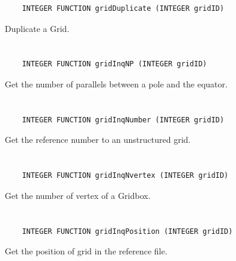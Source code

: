 \begin{verbatim}
    INTEGER FUNCTION gridDuplicate (INTEGER gridID)
\end{verbatim}

Duplicate a Grid.


\section*{\tt {}}

\begin{verbatim}
    INTEGER FUNCTION gridInqNP (INTEGER gridID)
\end{verbatim}

Get the number of parallels between a pole and the equator.


\section*{\tt {}}

\begin{verbatim}
    INTEGER FUNCTION gridInqNumber (INTEGER gridID)
\end{verbatim}

Get the reference number to an unstructured grid.


\section*{\tt {}}

\begin{verbatim}
    INTEGER FUNCTION gridInqNvertex (INTEGER gridID)
\end{verbatim}

Get the number of vertex of a Gridbox.


\section*{\tt {}}

\begin{verbatim}
    INTEGER FUNCTION gridInqPosition (INTEGER gridID)
\end{verbatim}

Get the position of grid in the reference file.


\section*{\tt {}}

